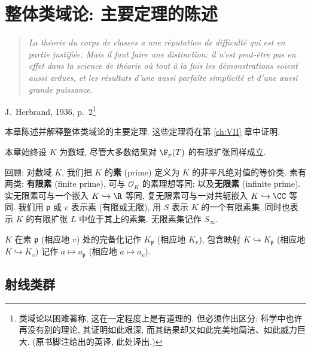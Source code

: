\chapter{整体类域论: 主要定理的陈述}\label{ch:V}

\begin{quote}
\itshape La théorie du corps de classes a une réputation de difficulté qui est en partie justifiée. Mais il faut faire une distinction: il n'est peut-être pas en effet dans la science de théorie où tout à la fois les démonstrations soient aussi ardues, et les résultats d'une aussi parfaite simplicité et d'une aussi grande puissance.
\end{quote}
\hspace*{\fill}J.~Herbrand, 1936, p.~2\footnote{类域论以困难著称, 这在一定程度上是有道理的. 但必须作出区分: 科学中也许再没有别的理论, 其证明如此艰深, 而其结果却又如此完美地简洁、如此威力巨大. (原书脚注给出的英译, 此处译出.)}

本章陈述并解释整体类域论的主要定理. 这些定理将在第 \ref{ch:VII} 章中证明.

本章始终设 $K$ 为数域, 尽管大多数结果对 $\F_p(T)$ 的有限扩张同样成立.

回顾: 对数域 $K$, 我们把 $K$ 的\textbf{素} (prime) 定义为 $K$ 的非平凡绝对值的等价类. 素有两类: \textbf{有限素} (finite prime), 可与 $\mathcal{O}_K$ 的素理想等同; 以及\textbf{无限素} (infinite prime). 实无限素可与一个嵌入 $K\hookrightarrow\R$ 等同, 复无限素可与一对共轭嵌入 $K\hookrightarrow\CC$ 等同. 我们用 $\mathfrak{p}$ 或 $v$ 表示素 (有限或无限), 用 $S$ 表示 $K$ 的一个有限素集, 同时也表示 $K$ 的有限扩张 $L$ 中位于其上的素集. 无限素集记作 $S_\infty$.

$K$ 在素 $\mathfrak{p}$ (相应地 $v$) 处的完备化记作 $K_{\mathfrak{p}}$ (相应地 $K_v$), 包含映射 $K\hookrightarrow K_{\mathfrak{p}}$ (相应地 $K\hookrightarrow K_v$) 记作 $a\mapsto a_{\mathfrak{p}}$ (相应地 $a\mapsto a_v$).

\section{射线类群}\label{sec:V.1}

